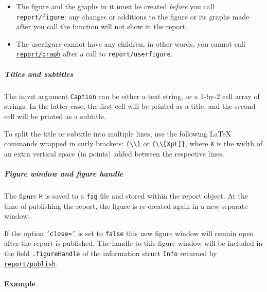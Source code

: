\begin{itemize}
\item
  The figure and the graphs in it must be created \emph{before} you call
  \texttt{report/figure}: any changes or additions to the figure or its
  graphs made after you call the function will not show in the report.
\item
  The userfigure cannot have any children; in other words, you cannot
  call \href{report/graph}{\texttt{report/graph}} after a call to
  \texttt{report/userfigure}.
\end{itemize}

\subparagraph{Titles and subtitles}\label{titles-and-subtitles}

The input argument \texttt{Caption} can be either a text string, or a
1-by-2 cell array of strings. In the latter case, the first cell will be
printed as a title, and the second cell will be printed as a subtitle.

To split the title or subtitle into multiple lines, use the following
LaTeX commands wrapped in curly brackets:
\texttt{\{\textbackslash{}\textbackslash{}\}} or
\texttt{\{\textbackslash{}\textbackslash{}{[}Xpt{]}\}}, where \texttt{X}
is the width of an extra vertical space (in points) added between the
respective lines.

\subparagraph{Figure window and figure
handle}\label{figure-window-and-figure-handle}

The figure \texttt{H} is saved to a \texttt{fig} file and stored within
the report object. At the time of publishing the report, the figure is
re-created again in a new separate window.

If the option \texttt{'close='} is set to \texttt{false} this new figure
window will remain open after the report is published. The handle to
this figure window will be included in the field \texttt{.figureHandle}
of the information struct \texttt{Info} returned by
\href{report/publish}{\texttt{report/publish}}.

\paragraph{Example}\label{example}


